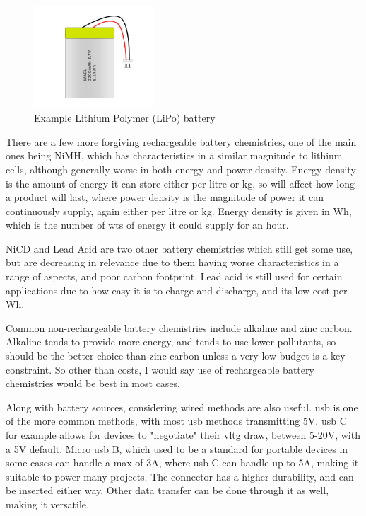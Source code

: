 \documentclass[a4paper,11pt]{report}
\begin{document}
\begin{figure}[H]
\centering
\includegraphics[width=0.4\textwidth]{lipobattery}
\caption{Example Lithium Polymer (LiPo) battery}
\end{figure}

There are a few more forgiving rechargeable battery chemistries, one of the main ones being NiMH, which has characteristics in a similar magnitude to lithium cells, although generally worse in both energy and power density. Energy density is the amount of energy it can store either per litre or kg, so will affect how long a product will last, where power density is the magnitude of power it can continuously supply, again either per litre or kg. Energy density is given in Wh, which is the number of \gls{wt}s of energy it could supply for an hour.

NiCD and Lead Acid are two other battery chemistries which still get some use, but are decreasing in relevance due to them having worse characteristics in a range of aspects, and poor carbon footprint. Lead acid is still used for certain applications due to how easy it is to charge and discharge, and its low cost per Wh.

Common non-rechargeable battery chemistries include alkaline and zinc carbon. Alkaline tends to provide more energy, and tends to use lower pollutants, so should be the better choice than zinc carbon unless a very low budget is a key constraint. So other than costs, I would say use of rechargeable battery chemistries would be best in most cases.

Along with battery sources, considering wired methods are also useful. \gls{usb} is one of the more common methods, with most \gls{usb} methods transmitting 5V. \gls{usb} C for example allows for devices to "negotiate" their \gls{vltg} draw, between 5-20V, with a 5V default. Micro \gls{usb} B, which used to be a standard for portable devices in some cases can handle a max of 3A, where \gls{usb} C can handle up to 5A, making it suitable to power many projects. The connector has a higher durability, and can be inserted either way. Other data transfer can be done through it as well, making it versatile.
\end{document}
